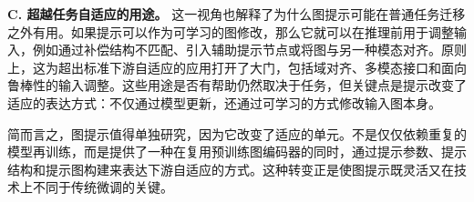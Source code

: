 \textbf{C. 超越任务自适应的用途。}
这一视角也解释了为什么图提示可能在普通任务迁移之外有用。如果提示可以作为可学习的图修改，那么它就可以在推理前用于调整输入，例如通过补偿结构不匹配、引入辅助提示节点或将图与另一种模态对齐。原则上，这为超出标准下游自适应的应用打开了大门，包括域对齐、多模态接口和面向鲁棒性的输入调整。这些用途是否有帮助仍然取决于任务，但关键点是提示改变了适应的表达方式：不仅通过模型更新，还通过可学习的方式修改输入图本身。

简而言之，图提示值得单独研究，因为它改变了适应的单元。不是仅仅依赖重复的模型再训练，而是提供了一种在复用预训练图编码器的同时，通过提示参数、提示结构和提示图构建来表达下游自适应的方式。这种转变正是使图提示既灵活又在技术上不同于传统微调的关键。
